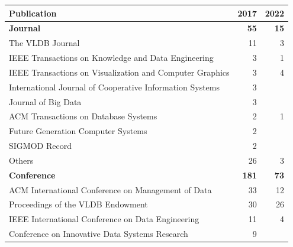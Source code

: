 \begin{table}[hptb]
  \small
  \begin{tabularx}{\textwidth}{X r r} \hline
    \textbf{Publication} & \textbf{2017} & \textbf{2022} \\ \hline
    \textbf{Journal}     & \textbf{55} & \textbf{15} \\
      \hspace{0.5em} The VLDB Journal                                         & 11 & 3 \\
      \hspace{0.5em} IEEE Transactions on Knowledge and Data Engineering      &  3 & 1 \\
      \hspace{0.5em} IEEE Transactions on Visualization and Computer Graphics &  3 & 4 \\
      \hspace{0.5em} International Journal of Cooperative Information Systems &  3 & \\
      \hspace{0.5em} Journal of Big Data                                      &  3 & \\
      \hspace{0.5em} ACM Transactions on Database Systems                     &  2 & 1 \\
      \hspace{0.5em} Future Generation Computer Systems                       &  2 & \\
      \hspace{0.5em} SIGMOD Record                                            &  2 & \\
      \hspace{0.5em} Others                                                   & 26 & 3 \\
    \textbf{Conference} & \textbf{181} & \textbf{73} \\
      \hspace{0.5em} ACM International Conference on Management of Data          & 33 & 12 \\
      \hspace{0.5em} Proceedings of the VLDB Endowment                           & 30 & 26 \\
      \hspace{0.5em} IEEE International Conference on Data Engineering           & 11 &  4 \\
      \hspace{0.5em} Conference on Innovative Data Systems Research              &  9 &    \\

\end{tabularx}
\end{table}
